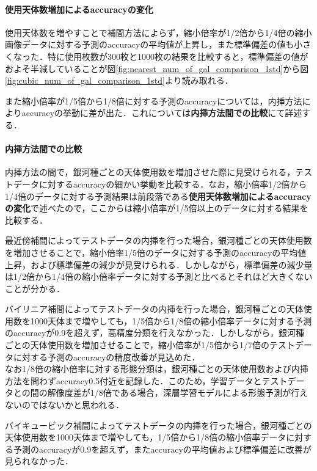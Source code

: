\documentclass[a4j, 11pt]{jreport}
\begin{document}
\paragraph{使用天体数増加によるaccuracyの変化}
使用天体数を増やすことで補間方法によらず，縮小倍率が1/2倍から1/4倍の縮小画像データに対する予測のaccuracyの平均値が上昇し，また標準偏差の値も小さくなった．特に使用枚数が300枚と1000枚の結果を比較すると，標準偏差の値がおよそ半減していることが図\ref{fig:nearest_num_of_gal_comparison_1std}から図\ref{fig:cubic_num_of_gal_comparison_1std}より読み取れる．

また縮小倍率が1/5倍から1/8倍に対する予測のaccuracyについては，内挿方法によりaccuracyの挙動に差が出た．これについては\textbf{内挿方法間での比較}にて詳述する．


\paragraph{内挿方法間での比較}
内挿方法の間で，銀河種ごとの天体使用数を増加させた際に見受けられる，テストデータに対するaccuracyの細かい挙動を比較する．なお，縮小倍率1/2倍から1/4倍のデータに対する予測結果は前段落である\textbf{使用天体数増加によるaccuracyの変化}で述べたので，ここからは縮小倍率が1/5倍以上のデータに対する結果を比較する．

最近傍補間によってテストデータの内挿を行った場合，銀河種ごとの天体使用数を増加させることで，縮小倍率1/5倍のデータに対する予測のaccuracyの平均値上昇，および標準偏差の減少が見受けられる．しかしながら，標準偏差の減少量は1/2倍から1/4倍の縮小倍率データに対する予測と比べるとそれほど大きくないことが分かる．

バイリニア補間によってテストデータの内挿を行った場合，銀河種ごとの天体使用数を1000天体まで増やしても，1/5倍から1/8倍の縮小倍率データに対する予測のaccuracyが0.9を超えず，高精度分類を行えなかった．しかしながら，銀河種ごとの天体使用数を増加させることで，縮小倍率が1/5倍から1/7倍のテストデータに対する予測のaccuracyの精度改善が見込めた．
\\なお1/8倍の縮小倍率に対する形態分類は，銀河種ごとの天体使用数および内挿方法を問わずaccuracy0.5付近を記録した．このため，学習データとテストデータとの間の解像度差が1/8倍である場合，深層学習モデルによる形態予測が行えないのではないかと思われる．

バイキュービック補間によってテストデータの内挿を行った場合，銀河種ごとの天体使用数を1000天体まで増やしても，1/5倍から1/8倍の縮小倍率データに対する予測のaccuracyが0.9を超えず，またaccuracyの平均値および標準偏差に改善が見られなかった．
\end{document}
